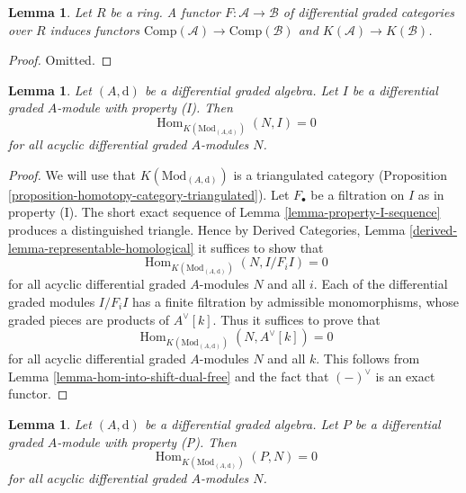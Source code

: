 \documentclass{stacks-project}
\theoremstyle{plain}
\newtheorem{lemma}[subsection]{Lemma}
\theoremstyle{definition}
\theoremstyle{remark}
\numberwithin{equation}{subsection}
\def\Hom{\mathop{\mathrm{Hom}}\nolimits}
\begin{document}
\begin{lemma}
\label{lemma-functorial}
Let $R$ be a ring. A functor $F : \mathcal{A} \to \mathcal{B}$
of differential graded categories over $R$ induces functors
$\text{Comp}(\mathcal{A}) \to \text{Comp}(\mathcal{B})$
and $K(\mathcal{A}) \to K(\mathcal{B})$.
\end{lemma}

\begin{proof}
Omitted.
\end{proof}

\begin{lemma}
\label{lemma-property-I-K-injective}
Let $(A, \text{d})$ be a differential graded algebra.
Let $I$ be a differential graded $A$-module with property (I).
Then
$$
\Hom_{K(\text{Mod}_{(A, \text{d})})}(N, I) = 0
$$
for all acyclic differential graded $A$-modules $N$.
\end{lemma}

\begin{proof}
We will use that $K(\text{Mod}_{(A, \text{d})})$ is a triangulated
category (Proposition \ref{proposition-homotopy-category-triangulated}).
Let $F_\bullet$ be a filtration on $I$ as in property (I).
The short exact sequence of Lemma \ref{lemma-property-I-sequence}
produces a distinguished triangle. Hence by
Derived Categories, Lemma \ref{derived-lemma-representable-homological}
it suffices to show that
$$
\Hom_{K(\text{Mod}_{(A, \text{d})})}(N, I/F_iI) = 0
$$
for all acyclic differential graded $A$-modules $N$ and all $i$.
Each of the differential graded modules $I/F_iI$ has a finite filtration
by admissible monomorphisms, whose graded pieces are
products of $A^\vee[k]$. Thus it suffices to prove that
$$
\Hom_{K(\text{Mod}_{(A, \text{d})})}(N, A^\vee[k]) = 0
$$
for all acyclic differential graded $A$-modules $N$ and all $k$.
This follows from Lemma \ref{lemma-hom-into-shift-dual-free}
and the fact that $(-)^\vee$ is an exact functor.
\end{proof}

\begin{lemma}
\label{lemma-property-P-K-projective}
Let $(A, \text{d})$ be a differential graded algebra.
Let $P$ be a differential graded $A$-module with property (P).
Then
$$
\Hom_{K(\text{Mod}_{(A, \text{d})})}(P, N) = 0
$$
for all acyclic differential graded $A$-modules $N$.
\end{lemma}
\end{document}
